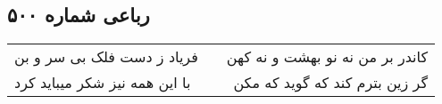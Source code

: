 \begin{center}
\section*{رباعی شماره ۵۰۰}
\label{sec:sh500}
\begin{longtable}{l p{0.5cm} r}
فریاد ز دست فلک بی سر و بن
&&
کاندر بر من نه نو بهشت و نه کهن
\\
با این همه نیز شکر میباید کرد
&&
گر زین بترم کند که گوید که مکن
\\
\end{longtable}
\end{center}
